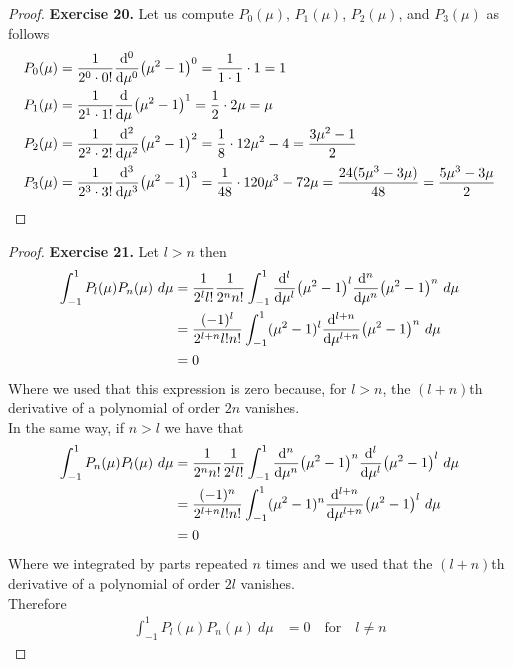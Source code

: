 \documentclass[11pt]{article}
\theoremstyle{definition}
\begin{document}
\cleardoublepage
\begin{proof}{\textbf{Exercise 20.}}
Let us compute $P_0(\mu)$, $P_1(\mu)$, $P_2(\mu)$, and $P_3(\mu)$ as follows
\begin{align*}
    P_0(\mu) &= \frac{1}{2^0 \cdot 0!}\dv[0]{\mu}(\mu^2 - 1)^0
    = \frac{1}{1 \cdot 1} \cdot 1 = 1\\
    P_1(\mu) &= \frac{1}{2^1 \cdot 1!}\dv{\mu}(\mu^2 - 1)^1
    = \frac{1}{2} \cdot 2\mu = \mu\\
    P_2(\mu) &= \frac{1}{2^2 \cdot 2!}\dv[2]{\mu}(\mu^2 - 1)^2
    = \frac{1}{8}\cdot 12\mu^2 - 4 = \frac{3\mu^2 - 1}{2}\\
    P_3(\mu) &= \frac{1}{2^3 \cdot 3!}\dv[3]{\mu}(\mu^2 - 1)^3
    = \frac{1}{48}\cdot 120\mu^3 - 72\mu = \frac{24(5\mu^3 - 3\mu)}{48}
    =  \frac{5\mu^3 - 3\mu}{2}
\end{align*}
\end{proof}
\begin{proof}{\textbf{Exercise 21.}}
Let $l > n$ then
\begin{align*}
    \int_{-1}^1 P_l(\mu)P_n(\mu)~d\mu
    &= \frac{1}{2^ll!}\frac{1}{2^nn!}\int_{-1}^1
    \dv[l]{\mu}(\mu^2 - 1)^l \dv[n]{\mu}(\mu^2 - 1)^n ~d\mu\\
    &= \frac{(-1)^l}{2^{l + n}l!n!}\int_{-1}^1
    (\mu^2 - 1)^l \dv[l+n]{\mu}(\mu^2 - 1)^n~d\mu\\
    &= 0
\end{align*}
Where we used that this expression is zero because, for $l > n$, the $(l + n)$th
derivative of a polynomial of order $2n$ vanishes.
\\
In the same way, if $n > l$ we have that
\begin{align*}
    \int_{-1}^1 P_n(\mu)P_l(\mu)~d\mu
    &= \frac{1}{2^nn!}\frac{1}{2^ll!}\int_{-1}^1
    \dv[n]{\mu}(\mu^2 - 1)^n \dv[l]{\mu}(\mu^2 - 1)^l~d\mu\\
    &= \frac{(-1)^n}{2^{l + n}l!n!}\int_{-1}^1
    (\mu^2 - 1)^n \dv[l+n]{\mu}(\mu^2 - 1)^l~d\mu\\
    &= 0
\end{align*}
Where we integrated by parts repeated $n$ times and we used that the $(l + n)$th
derivative of a polynomial of order $2l$ vanishes.
\\
Therefore
\begin{align*}
    \int_{-1}^1 P_l(\mu)P_n(\mu)~d\mu &= 0 \quad \text{for} \quad l \neq n
\end{align*}

\end{proof}
\end{document}
